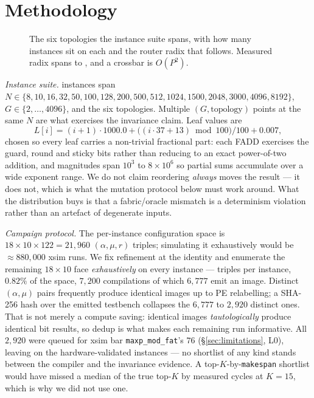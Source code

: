 \documentclass[journal,10pt]{IEEEtran}
\theoremstyle{plain}
\theoremstyle{definition}
\theoremstyle{remark}
\newcommand{\sv}[1]{\texttt{#1}}
\newcommand{\asgn}{\ensuremath{\alpha}}
\newcommand{\map}{\ensuremath{\mu}}
\begin{document}
\section{Methodology}\label{sec:method}

\begin{figure}[!t]\centering

\caption{The six topologies the instance suite spans, with how many instances sit on each and the router radix that follows. Measured radix spans \RadixMin{} to \RadixMax{}, and a crossbar is $O(P^2)$.}\label{fig:topologies}
\end{figure}


\emph{Instance suite.} \SuiteSize{} instances span $N \in \{8, 10, 16, 32, 50,\allowbreak
100, 128, 200, 500,\allowbreak 512, 1024, 1500,\allowbreak
2048, 3000, 4096, 8192\}$,
$G \in \{2,\ldots,4096\}$, and the six topologies. Multiple
$(G,\text{topology})$ points at the same $N$ are what exercises the invariance
claim. Leaf values are
\begin{equation}\label{eq:leaves}
L[i] = (i+1)\cdot 1000.0 + \bigl((i \cdot 37 + 13) \bmod 100\bigr)/100 + 0.007,
\end{equation}
chosen so every leaf carries a non-trivial fractional part: each FADD
exercises the guard, round and sticky bits rather than reducing to an exact
power-of-two addition, and magnitudes span $10^3$ to $8\times10^6$ so partial
sums accumulate over a wide exponent range. We do not claim reordering
\emph{always} moves the result --- it does not, which is what the mutation
protocol below must work around. What the distribution buys is that a
fabric/oracle mismatch is a determinism violation rather than an artefact of
degenerate inputs.


\emph{Campaign protocol.} The per-instance configuration space is
$18\times10\times122 = 21{,}960$ $(\asgn,\map,r)$ triples; simulating it
exhaustively would be ${\approx}880{,}000$ xsim runs. We fix refinement at the
identity and enumerate the remaining $18\times10$ face \emph{exhaustively} on
every instance --- \SelConfigsTotal{} triples per instance, $0.82\%$ of the
space, $7{,}200$ compilations of which $6{,}777$ emit an image. Distinct
$(\asgn,\map)$ pairs frequently produce identical images up to PE relabelling;
a SHA-256 hash over the emitted testbench collapses the $6{,}777$ to $2{,}920$
distinct ones. That is not merely a compute saving: identical images
\emph{tautologically} produce identical bit results, so dedup is what makes
each remaining run informative. All $2{,}920$ were queued for xsim bar
\sv{maxp\_mod\_fat}'s $76$ (\S\ref{sec:limitations}, L0), leaving
\InvAttempted{} on the \TournNInst{} hardware-validated instances --- no
shortlist of any kind stands between the compiler and the invariance evidence.
A top-$K$-by-\sv{makespan} shortlist would have missed a median
\TournLeakPctFifteen{} of the true top-$K$ by measured cycles at $K = 15$,
which is why we did not use one.
\end{document}
